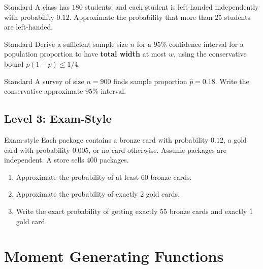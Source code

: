 \documentclass[12pt]{article}
\newcommand{\writespace}[1]{\vspace*{#1}}
\newcommand{\medws}{\writespace{1.8cm}}
\newcommand{\longws}{\writespace{2.8cm}}
\newcommand{\xlongws}{\writespace{4.1cm}}
\newcounter{problem}[section]
\begin{document}
\begin{practiceproblem}{Standard}
A class has $180$ students, and each student is left-handed independently with probability $0.12$. Approximate the probability that more than $25$ students are left-handed.
\end{practiceproblem}
\longws

\begin{practiceproblem}{Standard}
Derive a sufficient sample size $n$ for a $95\%$ confidence interval for a population proportion to have \textbf{total width} at most $w$, using the conservative bound $p(1-p)\le 1/4$.
\end{practiceproblem}
\longws

\begin{practiceproblem}{Standard}
A survey of size $n=900$ finds sample proportion $\hat p=0.18$. Write the conservative approximate $95\%$ interval.
\end{practiceproblem}
\medws

\subsection*{Level 3: Exam-Style}

\begin{practiceproblem}{Exam-style}
Each package contains a bronze card with probability $0.12$, a gold card with probability $0.005$, or no card otherwise. Assume packages are independent. A store sells $400$ packages.
\begin{enumerate}
  \item Approximate the probability of at least $60$ bronze cards.
  \item Approximate the probability of exactly $2$ gold cards.
  \item Write the exact probability of getting exactly $55$ bronze cards and exactly $1$ gold card.
\end{enumerate}
\end{practiceproblem}
\xlongws

\clearpage

\section{Moment Generating Functions}
\end{document}
